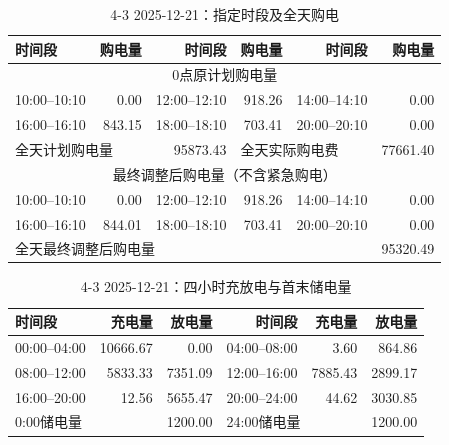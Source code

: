 \FloatBarrier
\begin{table}[htbp]\centering\scriptsize
\caption{4-3 2025-12-21：指定时段及全天购电}
\begin{tabular}{lrrrrr}\toprule
时间段 & 购电量 & 时间段 & 购电量 & 时间段 & 购电量\\\midrule
\multicolumn{6}{c}{0点原计划购电量}\\
10:00--10:10 & 0.00 & 12:00--12:10 & 918.26 & 14:00--14:10 & 0.00\\
16:00--16:10 & 843.15 & 18:00--18:10 & 703.41 & 20:00--20:10 & 0.00\\
\multicolumn{2}{l}{全天计划购电量} & 95873.43 & \multicolumn{2}{l}{全天实际购电费} & 77661.40\\
\multicolumn{6}{c}{最终调整后购电量（不含紧急购电）}\\
10:00--10:10 & 0.00 & 12:00--12:10 & 918.26 & 14:00--14:10 & 0.00\\
16:00--16:10 & 844.01 & 18:00--18:10 & 703.41 & 20:00--20:10 & 0.00\\
\multicolumn{5}{l}{全天最终调整后购电量} & 95320.49\\
\bottomrule\end{tabular}\end{table}

\begin{table}[htbp]\centering\scriptsize
\caption{4-3 2025-12-21：四小时充放电与首末储电量}
\begin{tabular}{lrrrrr}\toprule
时间段 & 充电量 & 放电量 & 时间段 & 充电量 & 放电量\\\midrule
00:00--04:00 & 10666.67 & 0.00 & 04:00--08:00 & 3.60 & 864.86\\
08:00--12:00 & 5833.33 & 7351.09 & 12:00--16:00 & 7885.43 & 2899.17\\
16:00--20:00 & 12.56 & 5655.47 & 20:00--24:00 & 44.62 & 3030.85\\
\multicolumn{2}{l}{0:00储电量} & 1200.00 & \multicolumn{2}{l}{24:00储电量} & 1200.00\\
\bottomrule\end{tabular}\end{table}

